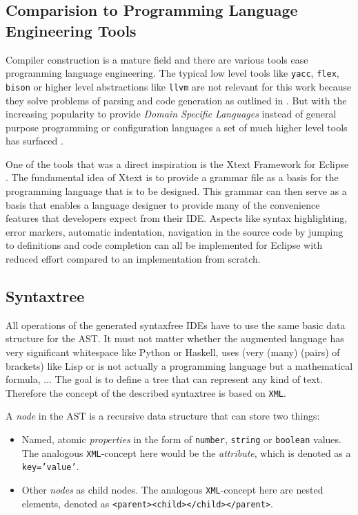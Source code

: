 \subsection{Comparision to Programming Language Engineering Tools}

Compiler construction is a mature field and there are various tools ease programming language engineering. The typical low level tools like \texttt{yacc}, \texttt{flex}, \texttt{bison} or higher level abstractions like \texttt{llvm} are not relevant for this work because they solve problems of parsing and code generation as outlined in . But with the increasing popularity to provide \textit{Domain Specific Languages} instead of general purpose programming or configuration languages a set of much higher level tools has surfaced \cite{mernik_dsl_2005}.

One of the tools that was a direct inspiration is the Xtext Framework for Eclipse \cite{efftinge_xtext}. The fundamental idea of Xtext is to provide a grammar file as a basis for the programming language that is to be designed. This grammar can then serve as a basis that enables a language designer to provide many of the convenience features that developers expect from their IDE. Aspects like syntax highlighting, error markers, automatic indentation, navigation in the source code by jumping to definitions and code completion can all be implemented for Eclipse with reduced effort compared to an implementation from scratch.

\subsection{Syntaxtree}

All operations of the generated syntaxfree IDEs have to use the same basic data structure for the AST. It must not matter whether the augmented language has very significant whitespace like Python or Haskell, uses (very (many) (pairs) of brackets) like Lisp or is not actually a programming language but a mathematical formula, ... The goal is to define a tree that can represent any kind of text. Therefore the concept of the described syntaxtree is based on \texttt{XML}\cite{xml_spec}.

A \textit{node} in the AST is a recursive data structure that can store two things:

\begin{itemize}
\item Named, atomic \textit{properties} in the form of \texttt{number}, \texttt{string} or \texttt{boolean} values. The analogous \texttt{XML}-concept here would be the \textit{attribute}, which is denoted as a \texttt{key='value'}.
\item Other \textit{nodes} as child nodes. The analogous \texttt{XML}-concept here are nested elements, denoted as \texttt{<parent><child></child></parent>}.
\end{itemize}

